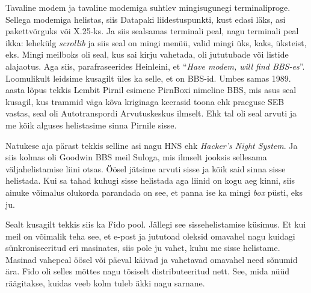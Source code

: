 
Tavaline modem ja tavaline modemiga suhtlev mingisugunegi terminaliproge. 
Sellega modemiga helistas, siis Datapaki liidestuspunkti, kust edasi läks, asi 
pakettvõrguks või X.25-ks. Ja siis sealsamas terminali peal, nagu terminali 
peal ikka: lehekülg \emph{scrollib} ja siis seal on mingi menüü, valid mingi 
üks, kaks, üksteist, eks. Mingi meilboks oli seal, kus sai kirju vahetada, oli  
jututubade või listide alajaotus. Aga siis,  parafraseerides Heinleini, et 
\enquote{\emph{Have modem, will find BBS-es}}. 
Loomulikult leidsime kusagilt üles ka selle, et on  BBS-id. Umbes samas 1989. 
aasta lõpus tekkis Lembit Pirnil esimene 
PirnBoxi nimeline  BBS, mis asus seal kusagil, kus trammid 
väga kõva kriginaga keerasid toona ehk praeguse SEB vastas, seal oli 
Autotranspordi Arvutuskeskus ilmselt. Ehk tal oli seal arvuti ja me 
kõik alguses helistasime  sinna Pirnile sisse. 

Natukese aja pärast tekkis selline asi nagu HNS ehk \emph{Hacker's Night 
System}. Ja siis kolmas oli Goodwin BBS meil 
Suloga, mis  ilmselt jooksis sellesama 
väljahelistamise liini otsas. Öösel jätsime  arvuti sisse ja kõik said sinna 
sisse helistada. Kui sa tahad kuhugi sisse helistada aga liinid on kogu aeg 
kinni, siis ainuke võimalus olukorda parandada on see, et panna ise ka mingi 
\emph{box} püsti, eks ju. 

Sealt kusagilt tekkis siis ka Fido pool. Jällegi see sissehelistamise küsimus. 
Et kui meil on  võimalik teha see, et e-post ja jututoad oleksid omavahel nagu 
kuidagi  sünkroniseeritud eri masinates, siis pole ju vahet, kuhu me sisse 
helistame. Masinad vahepeal öösel või päeval käivad ja vahetavad omavahel need 
sõnumid ära. Fido oli selles mõttes nagu tõsiselt distributeeritud nett. See, 
mida nüüd räägitakse, kuidas  veeb kolm tuleb äkki nagu sarnane. 



